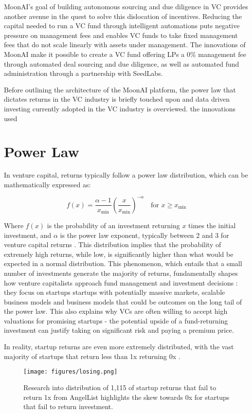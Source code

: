 \documentclass[a4paper, oneside]{discothesis}
\begin{document}
MoonAI's goal of building autonomous sourcing and due diligence in VC provides another avenue in the quest to solve this dislocation of incentives. Reducing the capital needed to run a VC fund through intelligent automations puts negative pressure on management fees and enables VC funds to take fixed management fees that do not scale linearly with assets under management. The innovations of MoonAI make it possible to create a VC fund offering LPs a 0\% management fee through automated deal sourcing and due diligence, as well as automated fund administration through a partnership with SeedLabs. 

Before outlining the architecture of the MoonAI platform, the power law that dictates returns in the VC industry is briefly touched upon and data driven investing currently adopted in the VC industry is overviewed.  the innovations used 

\section{Power Law}

In venture capital, returns typically follow a power law distribution, which can be mathematically expressed as:

\begin{equation}
f(x) = \frac{\alpha - 1}{x_{\text{min}}} \left(\frac{x}{x_{\text{min}}}\right)^{-\alpha} \quad \text{for } x \geq x_{\text{min}}
\end{equation}

Where $f(x)$ is the probability of an investment returning $x$ times the initial investment, and $\alpha$ is the power law exponent, typically between 2 and 3 for venture capital returns \cite{clauset2009power}. This distribution implies that the probability of extremely high returns, while low, is significantly higher than what would be expected in a normal distribution. This phenomenon, which entails that a small number of investments generate the majority of returns, fundamentally shapes how venture capitalists approach fund management and investment decisions \cite{peter2015power}: they focus on startups startups with potentially massive markets, scalable business models and business models that could be outcomes on the long tail of the power law. This also explains why VCs are often willing to accept high valuations for promising startups - the potential upside of a fund-returning investment can justify taking on significant risk and paying a premium price.

In reality, startup returns are even more extremely distributed, with the vast majority of startups that return less than 1x returning 0x \cite{othman2019startup}.
\begin{figure}[htbp]
    \centering
    \texttt{[image: figures/losing.png]}
    \caption{Research into distribution of 1,115 of startup returns that fail to return 1x from AngelList highlights the skew towards 0x for startups that fail to return investment. \cite{othman2022howmuchcanyouloseonafailedstartupinvestment}}
    \label{fig:startup_returns_distribution}
\end{figure}
\end{document}
